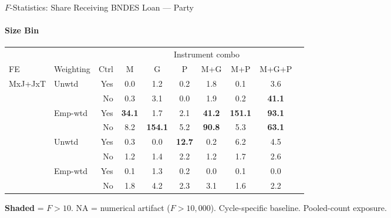 \documentclass[aspectratio=169,10pt]{beamer}
\newcommand{\fpass}[1]{\cellcolor{pass}\textbf{#1}}
\begin{document}
\begin{frame}[t]{$F$-Statistics: Share Receiving BNDES Loan --- Party}
\framesubtitle{Size Bin}
\begin{center}
\footnotesize
\setlength{\tabcolsep}{3.5pt}
\renewcommand{\arraystretch}{1.05}
\begin{tabular}{@{}llrccccccc@{}}
\toprule
 & & & \multicolumn{6}{c}{Instrument combo} \\
\cmidrule(l{2pt}r{2pt}){4-9}
FE & Weighting & Ctrl & M & G & P & M+G & M+P & M+G+P \\
\midrule
  \multirow{4}{*}{MxJ+JxT} & \multirow{2}{*}{Unwtd} & Yes & 0.0 & 1.2 & 0.2 & 1.8 & 0.1 & 3.6 \\
   &  & No & 0.3 & 3.1 & 0.0 & 1.9 & 0.2 & \fpass{41.1} \\
   & \multirow{2}{*}{Emp-wtd} & Yes & \fpass{34.1} & 1.7 & 2.1 & \fpass{41.2} & \fpass{151.1} & \fpass{93.1} \\
   &  & No & 8.2 & \fpass{154.1} & 5.2 & \fpass{90.8} & 5.3 & \fpass{63.1} \\
\addlinespace[5pt]
  \multirow{4}{*}{MxJ+MxT} & \multirow{2}{*}{Unwtd} & Yes & 0.3 & 0.0 & \fpass{12.7} & 0.2 & 6.2 & 4.5 \\
   &  & No & 1.2 & 1.4 & 2.2 & 1.2 & 1.7 & 2.6 \\
   & \multirow{2}{*}{Emp-wtd} & Yes & 0.1 & 1.3 & 0.2 & 0.0 & 0.1 & 0.0 \\
   &  & No & 1.8 & 4.2 & 2.3 & 3.1 & 1.6 & 2.2 \\
\bottomrule
\end{tabular}
\end{center}
{\scriptsize \colorbox{pass}{\textbf{Shaded}} = $F>10$. NA = numerical artifact ($F>10{,}000$). Cycle-specific baseline. Pooled-count exposure.}
\end{frame}
\end{document}
